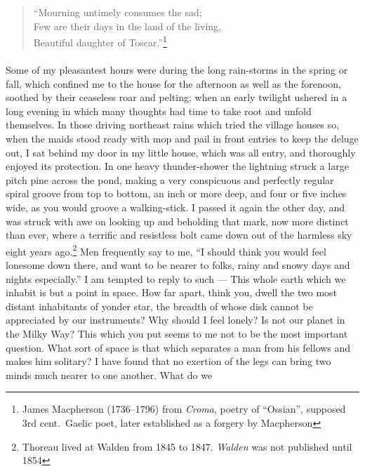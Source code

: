 \documentclass[letterpaper,12pt]{article}
\begin{document}
\begin{verse}
    \enquote{Mourning untimely consumes the sad; \\
        Few are their days in the land of the living, \\
        Beautiful daughter of Toscar.}\footnote{James Macpherson (1736--1796)
        from \textit{Croma}, poetry of \enquote{Ossian}, supposed 3rd cent.\
        Gaelic poet, later established as a forgery by Macpherson}
\end{verse}

\paragraph{}
Some of my pleasantest hours were during the long rain-storms in the spring or
fall, which confined me to the house for the afternoon as well as the forenoon,
soothed by their ceaseless roar and pelting; when an early twilight ushered in a
long evening in which many thoughts had time to take root and unfold themselves.
In those driving northeast rains which tried the village houses so, when the
maids stood ready with mop and pail in front entries to keep the deluge out, I
sat behind my door in my little house, which was all entry, and thoroughly
enjoyed its protection. In one heavy thunder-shower the lightning struck a large
pitch pine across the pond, making a very conspicuous and perfectly regular
spiral groove from top to bottom, an inch or more deep, and four or five inches
wide, as you would groove a walking-stick. I passed it again the other day, and
was struck with awe on looking up and beholding that mark, now more distinct
than ever, where a terrific and resistless bolt came down out of the harmless
sky eight years ago.\footnote{Thoreau lived at Walden from 1845 to 1847.
    \textit{Walden} was not published until 1854} Men frequently say to me,
\enquote{I should think you would feel lonesome down there, and want to be
    nearer to folks, rainy and snowy days and nights especially.} I am tempted
to reply to such --- This whole earth which we inhabit is but a point in space.
How far apart, think you, dwell the two most distant inhabitants of yonder star,
the breadth of whose disk cannot be appreciated by our instruments? Why should I
feel lonely? Is not our planet in the Milky Way? This which you put seems to me
not to be the most important question. What sort of space is that which
separates a man from his fellows and makes him solitary? I have found that no
exertion of the legs can bring two minds much nearer to one another. What do we
\end{document}
